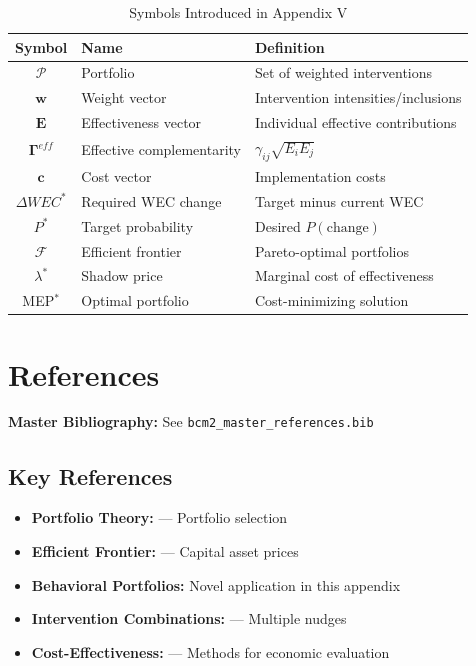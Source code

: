 \begin{table}[htbp]
\centering
\caption{Symbols Introduced in Appendix V}
\label{tab:mep-symbols}
\renewcommand{\arraystretch}{1.3}
\begin{tabular}{@{}clp{5.5cm}@{}}
\toprule
\textbf{Symbol} & \textbf{Name} & \textbf{Definition} \\
\midrule
$\mathcal{P}$ & Portfolio & Set of weighted interventions \\
$\mathbf{w}$ & Weight vector & Intervention intensities/inclusions \\
$\mathbf{E}$ & Effectiveness vector & Individual effective contributions \\
$\boldsymbol{\Gamma}^{eff}$ & Effective complementarity & $\gamma_{ij}\sqrt{E_i E_j}$ \\
$\mathbf{c}$ & Cost vector & Implementation costs \\
$\Delta WEC^*$ & Required WEC change & Target minus current WEC \\
$P^*$ & Target probability & Desired $P(\text{change})$ \\
$\mathcal{F}$ & Efficient frontier & Pareto-optimal portfolios \\
$\lambda^*$ & Shadow price & Marginal cost of effectiveness \\
MEP$^*$ & Optimal portfolio & Cost-minimizing solution \\
\bottomrule
\end{tabular}
\end{table}


\section{References}
\label{sec:mep-references}

\begin{tcolorbox}[colback=blue!5!white, colframe=blue!75!black]
\textbf{Master Bibliography:} See \texttt{bcm2\_master\_references.bib}
\end{tcolorbox}

\subsection{Key References}

\begin{itemize}[nosep]
\item \textbf{Portfolio Theory:} \citet{markowitz1952} --- Portfolio selection
\item \textbf{Efficient Frontier:} \citet{sharpe1964} --- Capital asset prices
\item \textbf{Behavioral Portfolios:} Novel application in this appendix
\item \textbf{Intervention Combinations:} \citet{johnson2021} --- Multiple nudges
\item \textbf{Cost-Effectiveness:} \citet{drummond2015} --- Methods for economic evaluation
\end{itemize}

